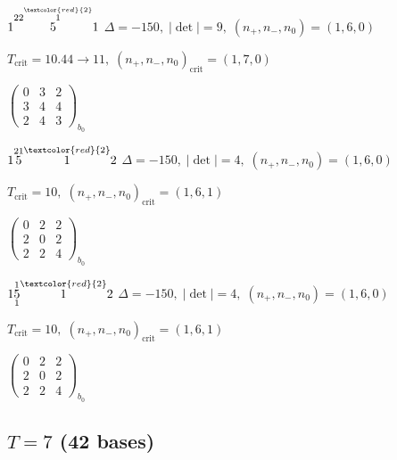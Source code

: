 \documentclass[10pt]{article}
\begin{document}
\smallskip

$1\overset{22\overset{\textcolor{red}{2}}{1}}{5}1$ \quad $\Delta=-150,\; |\det|=9,\; (n_+,n_-,n_0)=(1,6,0)$

\hspace{1em}$T_{\text{crit}}=10.44 \to 11,\; (n_+,n_-,n_0)_{\text{crit}}=(1,7,0)$

\hspace{2em}$\left(\begin{smallmatrix}0 & 3 & 2 \\ 3 & 4 & 4 \\ 2 & 4 & 3\end{smallmatrix}\right)_{\!b_0}$

\smallskip

$1\overset{21}{5}\overset{\textcolor{red}{2}}{1}2$ \quad $\Delta=-150,\; |\det|=4,\; (n_+,n_-,n_0)=(1,6,0)$

\hspace{1em}$T_{\text{crit}}=10,\; (n_+,n_-,n_0)_{\text{crit}}=(1,6,1)$

\hspace{2em}$\left(\begin{smallmatrix}0 & 2 & 2 \\ 2 & 0 & 2 \\ 2 & 2 & 4\end{smallmatrix}\right)_{\!b_0}$

\smallskip

$1\overset{1}{\underset{1}{5}}\overset{\textcolor{red}{2}}{1}2$ \quad $\Delta=-150,\; |\det|=4,\; (n_+,n_-,n_0)=(1,6,0)$

\hspace{1em}$T_{\text{crit}}=10,\; (n_+,n_-,n_0)_{\text{crit}}=(1,6,1)$

\hspace{2em}$\left(\begin{smallmatrix}0 & 2 & 2 \\ 2 & 0 & 2 \\ 2 & 2 & 4\end{smallmatrix}\right)_{\!b_0}$


\subsection*{$T = 7$ \quad (42 bases)}
\smallskip
\end{document}
